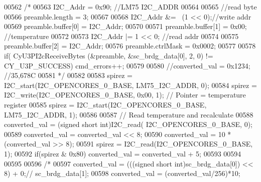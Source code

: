 \begin{DoxyCode}
00562 \textcolor{comment}{/*}
00563 \textcolor{comment}{                                I2C\_Addr = 0x90; //LM75 I2C\_ADDR}
00564 \textcolor{comment}{}
00565 \textcolor{comment}{                                //read byte}
00566 \textcolor{comment}{                                preamble.length = 3;}
00567 \textcolor{comment}{}
00568 \textcolor{comment}{                                I2C\_Addr &= ~(1 << 0);//write addr}
00569 \textcolor{comment}{                                preamble.buffer[0] = I2C\_Addr;}
00570 \textcolor{comment}{}
00571 \textcolor{comment}{                                preamble.buffer[1] = 0x00; //temperature}
00572 \textcolor{comment}{}
00573 \textcolor{comment}{                                I2C\_Addr |= 1 << 0; //read addr}
00574 \textcolor{comment}{}
00575 \textcolor{comment}{                                preamble.buffer[2] = I2C\_Addr;}
00576 \textcolor{comment}{                                preamble.ctrlMask  = 0x0002;}
00577 \textcolor{comment}{}
00578 \textcolor{comment}{                                if( CyU3PI2cReceiveBytes (&preamble, &sc\_brdg\_data[0], 2, 0)  !=
       CY\_U3P\_SUCCESS)  cmd\_errors++;}
00579 \textcolor{comment}{}
00580 \textcolor{comment}{                                //converted\_val = 0x1234; //35,678C}
00581 \textcolor{comment}{*/}
00582 
00583                                 spirez = I2C_start(I2C_OPENCORES_0_BASE, 
      LM75_I2C_ADDR, 0);
00584                                 spirez = I2C_write(I2C_OPENCORES_0_BASE, 0x00, 1);              \textcolor{comment}{// Pointer
       = temperature register}
00585                                 spirez = I2C_start(I2C_OPENCORES_0_BASE, 
      LM75_I2C_ADDR, 1);
00586 
00587                                 \textcolor{comment}{// Read temperature and recalculate}
00588                                 converted_val = (\textcolor{keywordtype}{signed} \textcolor{keywordtype}{short} int)I2C_read(
      I2C_OPENCORES_0_BASE, 0);
00589                                 converted_val = converted_val << 8;
00590                                 converted_val = 10 * (converted_val >> 8);
00591                                 spirez = I2C_read(I2C_OPENCORES_0_BASE, 1);
00592                                 \textcolor{keywordflow}{if}(spirez & 0x80) converted_val = converted_val + 5;
00593 
00594 
00595 
00596 \textcolor{comment}{/*}
00597 \textcolor{comment}{                                converted\_val = (((signed short int)sc\_brdg\_data[0]) << 8) + 0;//
      sc\_brdg\_data[1];}
00598 \textcolor{comment}{                                converted\_val = (converted\_val/256)*10;}

\end{DoxyCode}
